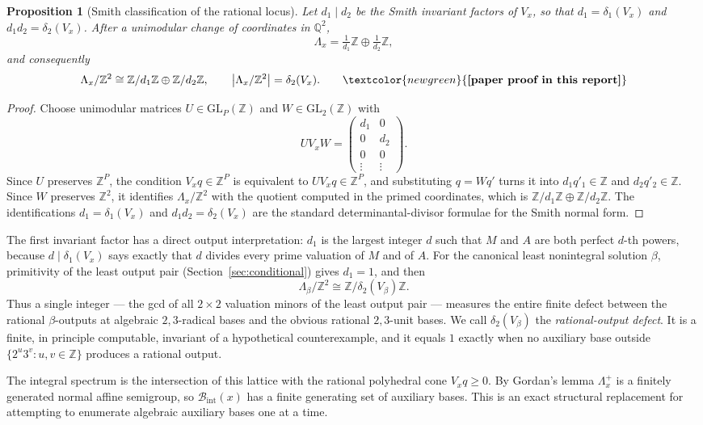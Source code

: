 \documentclass[11pt,oneside]{article}
\newtheorem{proposition}[theorem]{Proposition}
\theoremstyle{definition}
\theoremstyle{remark}
\newcommand{\Z}{\mathbb Z}
\newcommand{\Q}{\mathbb Q}
\newcommand{\statusnew}{\textcolor{newgreen}{\textbf{[paper proof in this report]}}}
\begin{document}
\begin{proposition}[Smith classification of the rational locus]
\label{vl:prop-smith}
Let $d_1\mid d_2$ be the Smith invariant factors of $V_x$, so that $d_1=\delta_1(V_x)$ and
$d_1d_2=\delta_2(V_x)$.  After a unimodular change of coordinates in $\Q^2$,
\[
  \Lambda_x=\tfrac1{d_1}\Z\oplus\tfrac1{d_2}\Z ,
\]
and consequently
\[
  \Lambda_x/\Z^2\cong\Z/d_1\Z\oplus\Z/d_2\Z,
  \qquad
  \bigl|\Lambda_x/\Z^2\bigr|=\delta_2(V_x).
  \qquad\statusnew
\]
\end{proposition}

\begin{proof}
Choose unimodular matrices $U\in\mathrm{GL}_P(\Z)$ and $W\in\mathrm{GL}_2(\Z)$ with
\[
 UV_xW=\begin{pmatrix}d_1&0\\0&d_2\\0&0\\\vdots&\vdots\end{pmatrix}.
\]
Since $U$ preserves $\Z^{P}$, the condition $V_xq\in\Z^{P}$ is equivalent to
$UV_xq\in\Z^{P}$, and substituting $q=Wq'$ turns it into $d_1q'_1\in\Z$ and $d_2q'_2\in\Z$.
Since $W$ preserves $\Z^2$, it identifies $\Lambda_x/\Z^2$ with the quotient computed in the
primed coordinates, which is $\Z/d_1\Z\oplus\Z/d_2\Z$.  The identifications
$d_1=\delta_1(V_x)$ and $d_1d_2=\delta_2(V_x)$ are the standard determinantal-divisor
formulae for the Smith normal form.
\end{proof}

The first invariant factor has a direct output interpretation: $d_1$ is the largest integer
$d$ such that $M$ and $A$ are both perfect $d$-th powers, because $d\mid\delta_1(V_x)$ says
exactly that $d$ divides every prime valuation of $M$ and of $A$.  For the canonical least
nonintegral solution $\beta$, primitivity of the least output pair (Section~\ref{sec:conditional})
gives $d_1=1$, and then
\[
  \Lambda_\beta/\Z^2\cong\Z/\delta_2(V_\beta)\Z .
\]
Thus a single integer --- the gcd of all $2\times2$ valuation minors of the least output pair
--- measures the entire finite defect between the rational $\beta$-outputs at algebraic
$2,3$-radical bases and the obvious rational $2,3$-unit bases.  We call $\delta_2(V_\beta)$
the \emph{rational-output defect}.  It is a finite, in principle computable, invariant of a
hypothetical counterexample, and it equals $1$ exactly when no auxiliary base outside
$\{2^u3^v:u,v\in\Z\}$ produces a rational output.

The integral spectrum is the intersection of this lattice with the rational polyhedral cone
$V_xq\ge0$.  By Gordan's lemma $\Lambda_x^{+}$ is a finitely generated normal affine
semigroup, so $\mathcal B_{\mathrm{int}}(x)$ has a finite generating set of auxiliary bases.
This is an exact structural replacement for attempting to enumerate algebraic auxiliary bases
one at a time.
\end{document}
